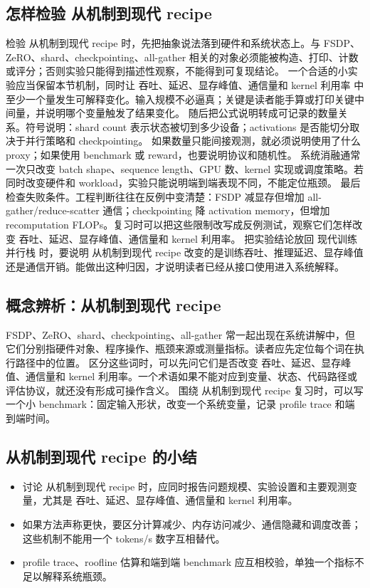 \documentclass[a4paper]{article}
\begin{document}
\subsection{怎样检验 从机制到现代 recipe}
检验 从机制到现代 recipe 时，先把抽象说法落到硬件和系统状态上。与 FSDP、ZeRO、shard、checkpointing、all-gather 相关的对象必须能被构造、打印、计数或评分；否则实验只能得到描述性观察，不能得到可复现结论。
一个合适的小实验应当保留本节机制，同时让 吞吐、延迟、显存峰值、通信量和 kernel 利用率 中至少一个量发生可解释变化。输入规模不必逼真；关键是读者能手算或打印关键中间量，并说明哪个变量触发了结果变化。
随后把公式说明转成可记录的数量关系。符号说明：shard count 表示状态被切到多少设备；activations 是否能切分取决于并行策略和 checkpointing。 如果数量只能间接观测，就必须说明使用了什么 proxy；如果使用 benchmark 或 reward，也要说明协议和随机性。
系统消融通常一次只改变 batch shape、sequence length、GPU 数、kernel 实现或调度策略。若同时改变硬件和 workload，实验只能说明端到端表现不同，不能定位瓶颈。
最后检查失败条件。工程判断往往在反例中变清楚：FSDP 减显存但增加 all-gather/reduce-scatter 通信；checkpointing 降 activation memory，但增加 recomputation FLOPs。复习时可以把这些限制改写成反例测试，观察它们怎样改变 吞吐、延迟、显存峰值、通信量和 kernel 利用率。
把实验结论放回 现代训练并行栈 时，要说明 从机制到现代 recipe 改变的是训练吞吐、推理延迟、显存峰值还是通信开销。能做出这种归因，才说明读者已经从接口使用进入系统解释。
\subsection{概念辨析：从机制到现代 recipe}
FSDP、ZeRO、shard、checkpointing、all-gather 常一起出现在系统讲解中，但它们分别指硬件对象、程序操作、瓶颈来源或测量指标。读者应先定位每个词在执行路径中的位置。
区分这些词时，可以先问它们是否改变 吞吐、延迟、显存峰值、通信量和 kernel 利用率。一个术语如果不能对应到变量、状态、代码路径或评估协议，就还没有形成可操作含义。
围绕 从机制到现代 recipe 复习时，可以写一个小 benchmark：固定输入形状，改变一个系统变量，记录 profile trace 和端到端时间。
\subsection{从机制到现代 recipe 的小结}
\begin{itemize}
\item 讨论 从机制到现代 recipe 时，应同时报告问题规模、实验设置和主要观测变量，尤其是 吞吐、延迟、显存峰值、通信量和 kernel 利用率。
\item 如果方法声称更快，要区分计算减少、内存访问减少、通信隐藏和调度改善；这些机制不能用一个 tokens/s 数字互相替代。
\item profile trace、roofline 估算和端到端 benchmark 应互相校验，单独一个指标不足以解释系统瓶颈。
\end{itemize}
\end{document}
